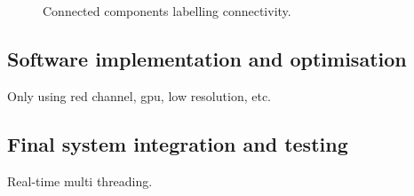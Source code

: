 \begin{figure}[h]
    \centering
    \mbox{\hspace{1cm}}
    \caption{Connected components labelling connectivity.}
    \label{fig:ccl_connectivity}
\end{figure}

\subsection{Software implementation and optimisation}
Only using red channel, \gls{gpu}, low resolution, etc.


\subsection{Final system integration and testing}
Real-time multi threading.

\newpage


